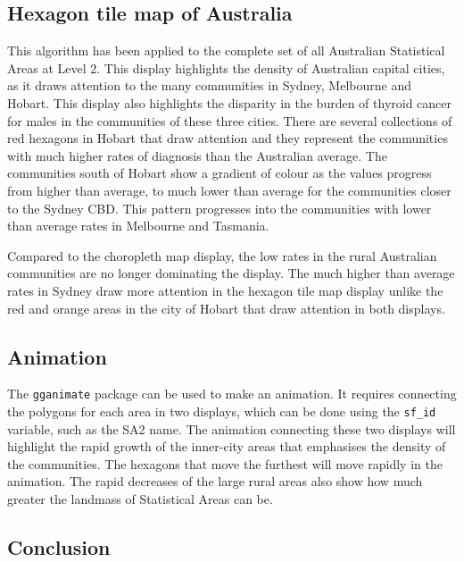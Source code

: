 \hypertarget{hexagon-tile-map-of-australia}{%
\subsection{Hexagon tile map of
Australia}\label{hexagon-tile-map-of-australia}}

This algorithm has been applied to the complete set of all Australian
Statistical Areas at Level 2. This display highlights the density of
Australian capital cities, as it draws attention to the many communities
in Sydney, Melbourne and Hobart. This display also highlights the
disparity in the burden of thyroid cancer for males in the communities
of these three cities. There are several collections of red hexagons in
Hobart that draw attention and they represent the communities with much
higher rates of diagnosis than the Australian average. The communities
south of Hobart show a gradient of colour as the values progress from
higher than average, to much lower than average for the communities
closer to the Sydney CBD. This pattern progresses into the communities
with lower than average rates in Melbourne and Tasmania.

Compared to the choropleth map display, the low rates in the rural
Australian communities are no longer dominating the display. The much
higher than average rates in Sydney draw more attention in the hexagon
tile map display unlike the red and orange areas in the city of Hobart
that draw attention in both displays.

\hypertarget{animation}{%
\subsection{Animation}\label{animation}}

The \texttt{gganimate} \citep{gganimate} package can be used to make an
animation. It requires connecting the polygons for each area in two
displays, which can be done using the \texttt{sf\_id} variable, such as
the SA2 name. The animation connecting these two displays will highlight
the rapid growth of the inner-city areas that emphasises the density of
the communities. The hexagons that move the furthest will move rapidly
in the animation. The rapid decreases of the large rural areas also show
how much greater the landmass of Statistical Areas can be.

\hypertarget{conclusion-03}{%
\subsection{Conclusion}\label{conclusion-03}}


